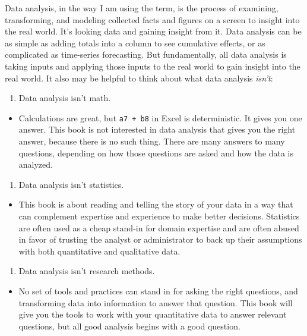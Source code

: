 \documentclass[]{book}
\providecommand{\tightlist}{%
  \setlength{\itemsep}{0pt}\setlength{\parskip}{0pt}}
\begin{document}
Data analysis, in the way I am using the term, is the process of examining, transforming, and modeling collected facts and figures on a screen to insight into the real world. It's looking data and gaining insight from it. Data analysis can be as simple as adding totals into a column to see cumulative effects, or as complicated as time-series forecasting. But fundamentally, all data analysis is taking inputs and applying those inputs to the real world to gain insight into the real world. It also may be helpful to think about what data analysis \emph{isn't}:

\begin{enumerate}
\def\labelenumi{\arabic{enumi}.}
\tightlist
\item
  Data analysis isn't math.
\end{enumerate}

\begin{itemize}
\tightlist
\item
  Calculations are great, but \texttt{a7\ +\ b8} in Excel is deterministic. It gives you one answer. This book is not interested in data analysis that gives you the right answer, because there is no such thing. There are many answers to many questions, depending on how those questions are asked and how the data is analyzed.
\end{itemize}

\begin{enumerate}
\def\labelenumi{\arabic{enumi}.}
\setcounter{enumi}{1}
\tightlist
\item
  Data analysis isn't statistics.
\end{enumerate}

\begin{itemize}
\tightlist
\item
  This book is about reading and telling the story of your data in a way that can complement expertise and experience to make better decisions. Statistics are often used as a cheap stand-in for domain expertise and are often abused in favor of trusting the analyst or administrator to back up their assumptions with both quantitative and qualitative data.
\end{itemize}

\begin{enumerate}
\def\labelenumi{\arabic{enumi}.}
\setcounter{enumi}{2}
\tightlist
\item
  Data analysis isn't research methods.
\end{enumerate}

\begin{itemize}
\tightlist
\item
  No set of tools and practices can stand in for asking the right questions, and transforming data into information to answer that question. This book will give you the tools to work with your quantitative data to answer relevant questions, but all good analysis begins with a good question.
\end{itemize}
\end{document}
